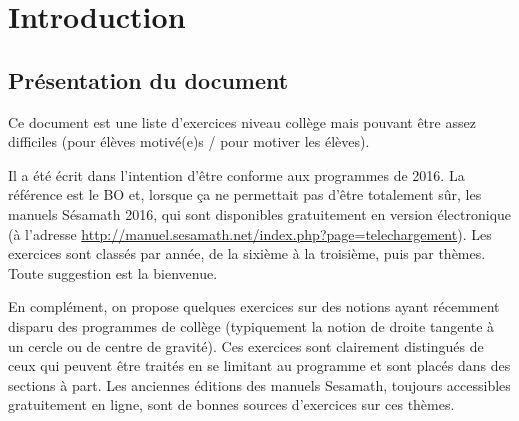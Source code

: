 







\debut %



\begin{multicols}{2}
\tableofcontents
\end{multicols}



\section{Introduction}

\subsection{Présentation du document}

Ce document est une liste d'exercices niveau collège mais pouvant être assez difficiles (pour élèves motivé(e)s / pour motiver les élèves).


Il a été écrit dans l'intention d'être conforme aux programmes de 2016. La référence est le BO et, lorsque ça ne permettait pas d'être totalement sûr, les manuels Sésamath 2016, qui sont disponibles gratuitement en version électronique (à l'adresse \url{http://manuel.sesamath.net/index.php?page=telechargement}). 
Les exercices sont classés par année, de la sixième à la troisième, puis par thèmes. Toute suggestion est la bienvenue.

En complément, on propose quelques exercices sur des notions ayant récemment disparu des programmes de collège (typiquement la notion de droite tangente à un cercle ou de centre de gravité). Ces exercices sont clairement distingués de ceux qui peuvent être traités en se limitant au programme et sont placés dans des sections à part. Les anciennes éditions des manuels Sesamath, toujours accessibles gratuitement en ligne, sont de bonnes sources d'exercices sur ces thèmes.
 
